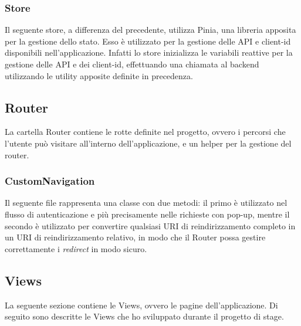 \subsubsection{Store}\label{subsubsec:store}
Il seguente store, a differenza del precedente, utilizza Pinia, una libreria apposita per la gestione dello stato.
Esso è utilizzato per la gestione delle API e client-id disponibili nell'applicazione. Infatti lo store inizializza le variabili reattive per la gestione
delle API e dei client-id, effettuando una chiamata al backend utilizzando le utility apposite definite in precedenza.

\subsection{Router}\label{subsec:router}
La cartella Router contiene le rotte definite nel progetto, ovvero i percorsi che l'utente può visitare all'interno dell'applicazione, e un helper per la gestione del router.
\subsubsection{CustomNavigation}\label{subsubsec:custom-navigation}
Il seguente file rappresenta una classe con due metodi: il primo è utilizzato nel flusso di autenticazione e più precisamente nelle richieste con pop-up,
mentre il secondo è utilizzato per convertire qualsiasi URI di reindirizzamento completo in un URI di reindirizzamento relativo, in modo che il Router
possa gestire correttamente i \textit{redirect} in modo sicuro.


\subsection{Views}\label{subsec:views}
La seguente sezione contiene le Views, ovvero le pagine dell'applicazione.
Di seguito sono descritte le Views che ho sviluppato durante il progetto di stage.


